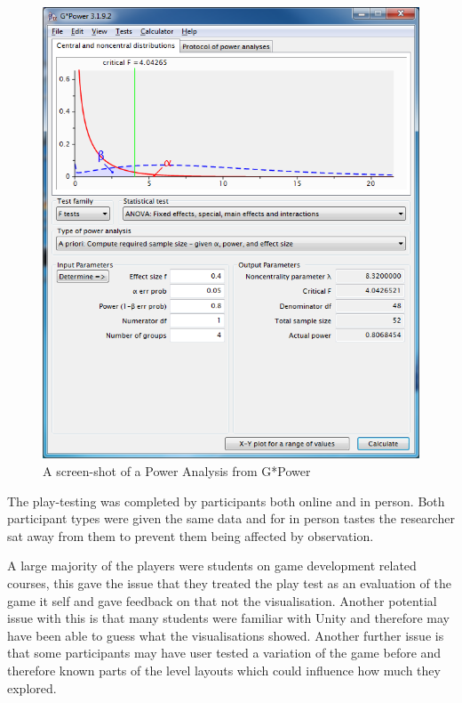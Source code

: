 \documentclass[journal]{IEEEtran}
\begin{document}
\begin{figure}[h]
	\includegraphics[width=1.0\linewidth]{PowerAnalysis.png}
	\caption{ A screen-shot of a Power Analysis from G*Power}
	\label{image:PowerAnalysis}
\end{figure}  


The play-testing was completed by participants both online and in person. Both participant types were given the same data and for in person tastes the researcher sat away from them to prevent them being affected by observation.

A large majority of the players were students on game development related courses, this gave the issue that they treated the play test as an evaluation of the game it self and gave feedback on that not the visualisation.  Another potential issue with this is that many students were familiar with Unity and therefore may have been able to guess what the visualisations showed. 
Another further issue is that some participants may have user tested a variation of the game before and therefore known parts of the level layouts which could influence how much they explored. 
\end{document}
